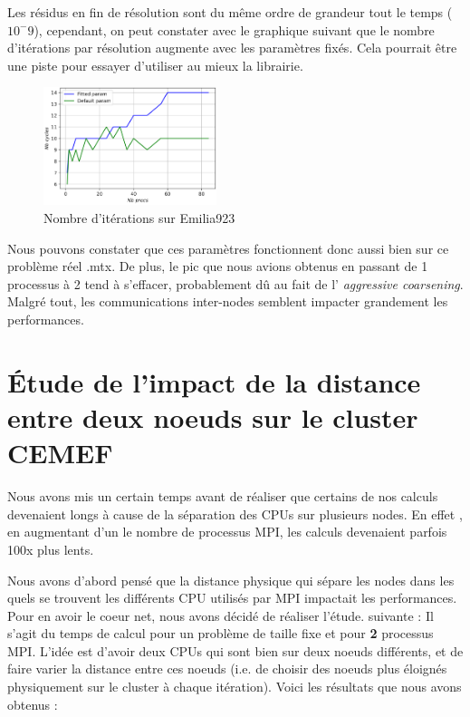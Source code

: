 \documentclass[10pt,twocolumn,letterpaper]{article}
\begin{document}
Les résidus en fin de résolution sont du même ordre de grandeur tout le temps
($10^-9$), cependant, on peut constater avec le graphique suivant que le nombre
d'itérations par résolution augmente avec les paramètres fixés. Cela pourrait
être une piste pour essayer d'utiliser au mieux la librairie.

\begin{figure}[H]
  \centering
  \caption{Nombre d'itérations sur Emilia923}
\includegraphics[width=0.45\textwidth]{fig/strong_best_param_emilia_nbiter.png}
\end{figure}

Nous pouvons constater que ces paramètres fonctionnent donc aussi bien sur ce
problème réel .mtx.
De plus, le pic que nous avions obtenus en passant de 1 processus
à 2 tend à s'effacer, probablement dû au fait de l'
\textit{aggressive coarsening}. Malgré tout, les communications inter-nodes
semblent impacter grandement les performances.

\section{Étude de l'impact de la distance entre deux noeuds sur le cluster
CEMEF}

Nous avons mis un certain temps avant de réaliser que certains de nos calculs
devenaient longs à cause de la séparation des CPUs sur plusieurs nodes. En effet
, en augmentant d'un le nombre de processus MPI, les calculs devenaient parfois
100x plus lents.

Nous avons d'abord pensé que la distance physique qui sépare les nodes dans
les quels se trouvent les différents CPU utilisés par MPI impactait les
performances. Pour en avoir le coeur net, nous avons décidé de réaliser l'étude.
suivante :
Il s'agit du temps de calcul pour un problème de taille fixe et pour \textbf{2}
processus MPI. L'idée est d'avoir deux CPUs qui sont bien sur deux noeuds
différents, et de faire varier la distance entre ces noeuds
(i.e. de choisir des noeuds plus éloignés physiquement sur le cluster à chaque
itération). Voici les résultats que nous avons obtenus :
\end{document}
